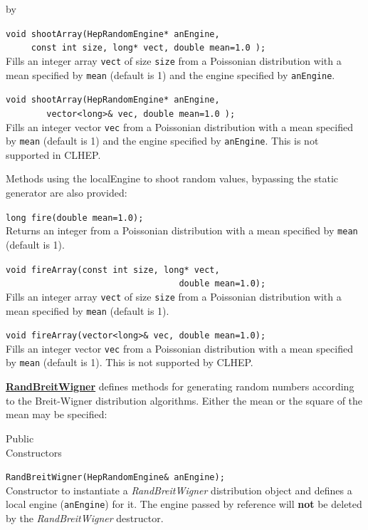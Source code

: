 \documentclass[twoside]{article}
\newcommand{\comp}[1]{\texttt{#1}}%
\newcommand{\entrylabel}[1]{\mbox{\textbf{{#1}}}\hfil}%
\newenvironment{entry}
{\begin{list}{}%
    {\renewcommand{\makelabel}{\entrylabel}%
     \setlength{\labelwidth}{90pt}%
     \setlength{\leftmargin}{\labelwidth}
     \advance\leftmargin by \labelsep%
      }%
    }%
  {\end{list}}
\newcommand{\Entrylabel}[1]%
{\raisebox{0pt}[1ex][0pt]{\makebox[\labelwidth][l]%
    {\parbox[t]{\labelwidth}{\hspace{0pt}\textbf{{#1}}}}}}
\newenvironment{Entry}%
{\renewcommand{\entrylabel}{\Entrylabel}\begin{entry}}%
  {\end{entry}}
\begin{document}
\begin{description}
\begin{Entry}
    \verb+void shootArray(HepRandomEngine* anEngine,+\\
    \verb+     const int size, long* vect, double mean=1.0 );+\\
    Fills an integer array \comp{vect} of size \comp{size} from a
    Poissonian distribution with a mean specified by \comp{mean}
    (default is 1) and the engine specified by \comp{anEngine}.

    \verb+void shootArray(HepRandomEngine* anEngine,+\\
    \verb+        vector<long>& vec, double mean=1.0 );+\\
    Fills an integer vector \comp{vec} from a
    Poissonian distribution with a mean specified by \comp{mean}
    (default is 1) and the engine specified by \comp{anEngine}.
    This is not supported in CLHEP.
    
    Methods using the localEngine to shoot random values, bypassing
    the static generator are also provided:

    \verb+long fire(double mean=1.0);+\\
    Returns an integer from a Poissonian distribution with a mean
    specified by \comp{mean} (default is 1).
  
    \verb+void fireArray(const int size, long* vect,+\\
    \verb+                                  double mean=1.0);+\\
    Fills an integer array \comp{vect} of size \comp{size} from a
    Poissonian distribution with a mean specified by \comp{mean}
    (default is 1).

    \verb+void fireArray(vector<long>& vec, double mean=1.0);+\\
    Fills an integer vector \comp{vec} from a
    Poissonian distribution with a mean specified by \comp{mean}
    (default is 1).  This is not supported by CLHEP.
  
    \begin{description}
      \item \underline{\bf RandBreitWigner}  defines methods for generating random
        numbers according to the Breit-Wigner distribution algorithms.
        Either the mean or the square of the mean may be specified:
    \end{description}
    
\item[Public\\ Constructors]

    \verb+RandBreitWigner(HepRandomEngine& anEngine);+\\
    Constructor to instantiate a {\em RandBreitWigner}
    distribution object and defines a local engine (\comp{anEngine})
    for it.  The engine passed by reference will {\bf not} be deleted
    by the {\em RandBreitWigner} destructor.
    

\end{Entry}
\end{description}
\end{document}
